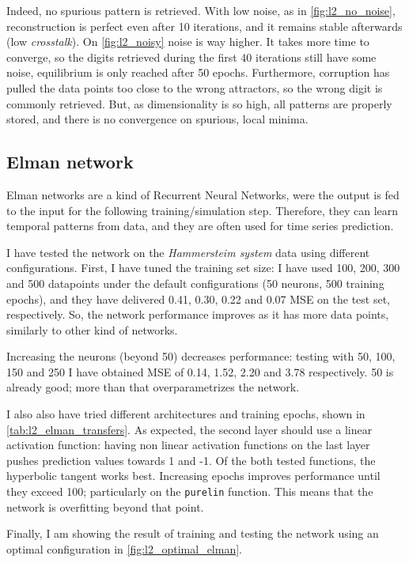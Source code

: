 \documentclass[a4paper, 10pt]{article}
\begin{document}
  Indeed, no spurious pattern is retrieved. With low noise, as in 
  \autoref{fig:l2_no_noise}, reconstruction is perfect even after 10 iterations,
  and it remains stable afterwards (low \emph{crosstalk}). On 
  \autoref{fig:l2_noisy} noise is way higher. It takes more time to converge,
  so the digits retrieved during the first 40 iterations still have some noise,
  equilibrium is only reached after 50 epochs.
  Furthermore, corruption has pulled the data points too close to the 
  wrong attractors,
  so the wrong digit is commonly retrieved. But, as dimensionality is so high,
  all patterns are properly stored, and there is no convergence on spurious, 
  local minima. 

  \subsection{Elman network}
  Elman networks are a kind of Recurrent Neural Networks, were the output is
  fed to the input for the following training/simulation step. Therefore, they
  can learn temporal patterns from data, and they are often used for time series
  prediction.

  I have tested the network on the \emph{Hammersteim system} data using
  different configurations. First, I have tuned the training set size:
  I have used 100, 200, 300 and 500 datapoints under the default configurations
  (50 neurons, 500 training epochs), and they have delivered 0.41, 0.30, 0.22 and
  0.07 MSE on the test set, respectively. So, the network performance improves
  as it has more data points, similarly to other kind of networks.

  
  Increasing the neurons (beyond 50) decreases performance: testing with 50, 100,
  150 and 250 I have obtained MSE of 0.14, 1.52, 2.20 and 3.78 respectively.
  50 is already good; more than that overparametrizes the network.

  I also also have tried different architectures and training epochs, shown in 
  \autoref{tab:l2_elman_transfers}. As expected, the second layer should
  use a linear activation function: having non linear activation functions on
  the last layer pushes prediction values towards 1 and -1. Of the both 
  tested functions, the hyperbolic tangent works best. Increasing epochs
  improves performance until they exceed 100; particularly on the \texttt{purelin}
  function. This means that the network is overfitting beyond that point.

  Finally, I am showing the result of training and testing the network using
  an optimal configuration in \autoref{fig:l2_optimal_elman}.
\end{document}
